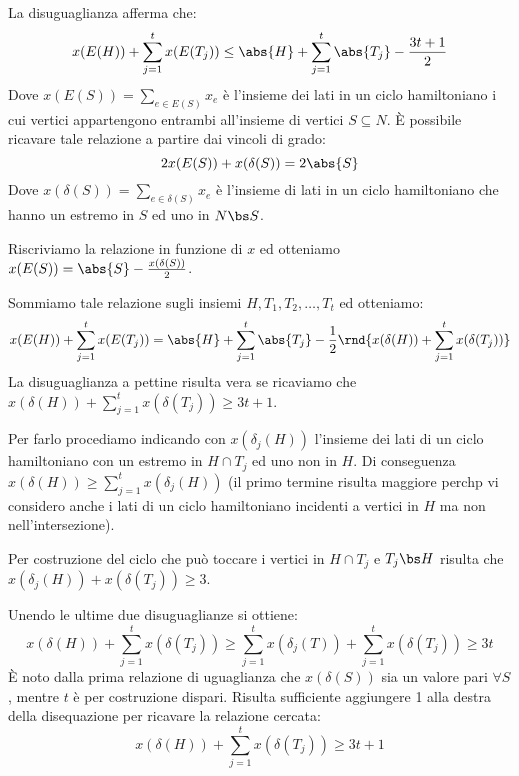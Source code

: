 \documentclass[\main/main.tex]{subfiles}
\begin{document}
La disuguaglianza afferma che:
\[
    x(E(H)) + \sum_{j=1}^t x(E(T_j)) \leq \abs{H} + \sum_{j=1}^t \abs{T_j} - \frac{3t+1}{2}
\]
Dove \(x(E(S)) = \sum_{e \in E(S)} x_e\) è l'insieme dei lati in un ciclo hamiltoniano i cui vertici appartengono entrambi all'insieme di vertici \(S\subseteq N\). È possibile ricavare tale relazione a partire dai vincoli di grado:\[
    2x(E(S)) + x(\delta(S)) = 2\abs{S}
\]Dove \(x(\delta(S)) = \sum_{e \in \delta(S)} x_e\) è l'insieme di lati in un ciclo hamiltoniano che hanno un estremo in \(S\) ed uno in \(N\bs S\).

Riscriviamo la relazione in funzione di \(x\) ed otteniamo \(x(E(S)) = \abs{S} - \frac{x(\delta(S))}{2}\).

Sommiamo tale relazione sugli insiemi \(H, T_1, T_2, \ldots, T_t\) ed otteniamo:
\[
    x(E(H)) + \sum_{j=1}^t x(E(T_j)) = \abs{H} + \sum_{j=1}^t \abs{T_j} - \frac{1}{2}\rnd{x(\delta(H))+\sum_{j=1}^t x(\delta(T_j))}
\]
La disuguaglianza a pettine risulta vera se ricaviamo che \(x(\delta(H)) + \sum_{j=1}^t x(\delta(T_j)) \geq 3t+1\).

Per farlo procediamo indicando con \(x(\delta_j(H))\) l'insieme dei lati di un ciclo hamiltoniano con un estremo in \(H \cap T_j\) ed uno non in \(H\). Di conseguenza \(x(\delta(H)) \geq \sum_{j=1}^t x(\delta_j(H))\) (il primo termine risulta maggiore perchp vi considero anche i lati di un ciclo hamiltoniano incidenti a vertici in \(H\) ma non nell'intersezione).

Per costruzione del ciclo che può toccare i vertici in \(H\cap T_j\) e \(T_j\bs H\) risulta che \(x(\delta_j(H)) + x(\delta(T_j)) \geq 3\).

Unendo le ultime due disuguaglianze si ottiene:
\[
    x(\delta(H)) + \sum_{j=1}^t x(\delta(T_j)) \geq \sum_{j=1}^t x(\delta_j(T)) + \sum_{j=1}^t x(\delta(T_j)) \geq 3t
\]
È noto dalla prima relazione di uguaglianza che \(x(\delta(S))\) sia un valore pari \(\forall S\), mentre \(t\) è per costruzione dispari. Risulta sufficiente aggiungere 1 alla destra della disequazione per ricavare la relazione cercata:
\[
    x(\delta(H)) + \sum_{j=1}^t x(\delta(T_j)) \geq 3t + 1
\]
\end{document}
